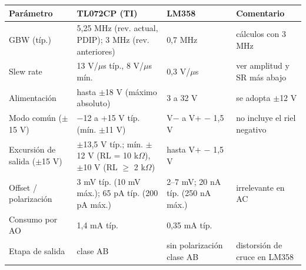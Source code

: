 \begin{tabular}{@{}p{3.0cm}p{5.4cm}p{3.4cm}p{3.0cm}@{}}
\toprule
Parámetro & TL072CP (TI) & LM358 & Comentario \\
\midrule
GBW (típ.) & 5,25 MHz (rev. actual, PDIP); 3 MHz (rev. anteriores) & 0,7 MHz & cálculos con 3 MHz \\
Slew rate & 13 V/$\mu$s típ., 8 V/$\mu$s mín. & 0,3 V/$\mu$s & ver amplitud y SR más abajo \\
Alimentación & hasta $\pm$18 V (máximo absoluto) & 3 a 32 V & se adopta $\pm$12 V \\
Modo común ($\pm$15 V) & $-$12 a +15 V típ. (mín. $\pm$11 V) & V$-$ a V+ $-$ 1,5 V & no incluye el riel negativo \\
Excursión de salida ($\pm$15 V) & $\pm$13,5 V típ.; mín. $\pm$12 V (RL = 10 k$\Omega$), $\pm$10 V (RL $\ge$ 2 k$\Omega$) & hasta V+ $-$ 1,5 V &  \\
Offset / polarización & 3 mV típ. (10 mV máx.); 65 pA típ. (200 pA máx.) & 2–7 mV; 20 nA típ. (250 nA máx.) & irrelevante en AC \\
Consumo por AO & 1,4 mA típ. & 0,35 mA típ. &  \\
Etapa de salida & clase AB & sin polarización clase AB & distorsión de cruce en LM358 \\
\bottomrule
\end{tabular}